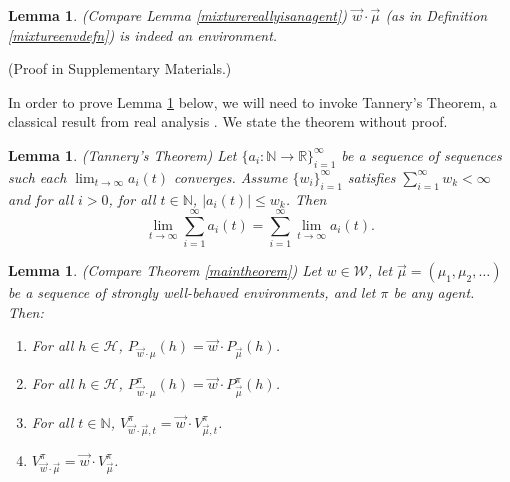 \documentclass[twoside]{article}
\newtheorem{lemma}[theorem]{Lemma}
\begin{document}
\begin{lemma}
\label{wcdotSisenvlemma}
    (Compare Lemma \ref{mixturereallyisanagent})
    $\vec w\cdot\vec\mu$ (as in Definition \ref{mixtureenvdefn})
    is indeed an environment.
\end{lemma}
\vspace{-0.5em}(Proof in Supplementary Materials.)


In order to prove Lemma \ref{envmaintheorem} below, we will need to invoke
Tannery's Theorem, a classical result from real analysis \cite{bromwich2005introduction}.
We state the theorem
without proof.

\begin{lemma}
\label{tannerysthm}
    (Tannery's Theorem)
    Let $\{a_i:\mathbb N\to\mathbb R\}_{i=1}^\infty$ be a sequence of sequences
    such each $\lim_{t\to\infty}a_i(t)$ converges.
    Assume $\{w_i\}_{i=1}^\infty$ satisfies
    $\sum_{i=1}^\infty w_k<\infty$ and for all $i>0$,
    for all $t\in\mathbb N$,
    $|a_i(t)|\leq w_k$. Then
    \[
        \lim_{t\to\infty}\sum_{i=1}^\infty a_i(t)
        =
        \sum_{i=1}^\infty\lim_{t\to\infty} a_i(t).
    \]
\end{lemma}

\begin{lemma}
\label{envmaintheorem}
    (Compare Theorem \ref{maintheorem})
    Let $w\in\mathscr W$, let $\vec\mu=(\mu_1,\mu_2,\ldots)$ be
    a sequence of strongly well-behaved environments, and let $\pi$ be any agent. Then:
    \begin{enumerate}
        \item
        For all $h\in\mathcal H$,
        $P_{\vec w\cdot\mu}(h)=\vec w\cdot P_{\vec\mu}(h)$.
        \item
        For all $h\in\mathcal H$,
        $P^\pi_{\vec w\cdot\mu}(h)=\vec w\cdot P^\pi_{\vec\mu}(h)$.
        \item
        For all $t\in\mathbb N$,
        $V^\pi_{\vec w\cdot \vec\mu,t}=\vec w\cdot V^\pi_{\vec\mu,t}$.
        \item
        $V^\pi_{\vec w\cdot \vec\mu}=\vec w\cdot V^\pi_{\vec\mu}$.
    \end{enumerate}
\end{lemma}
\end{document}
